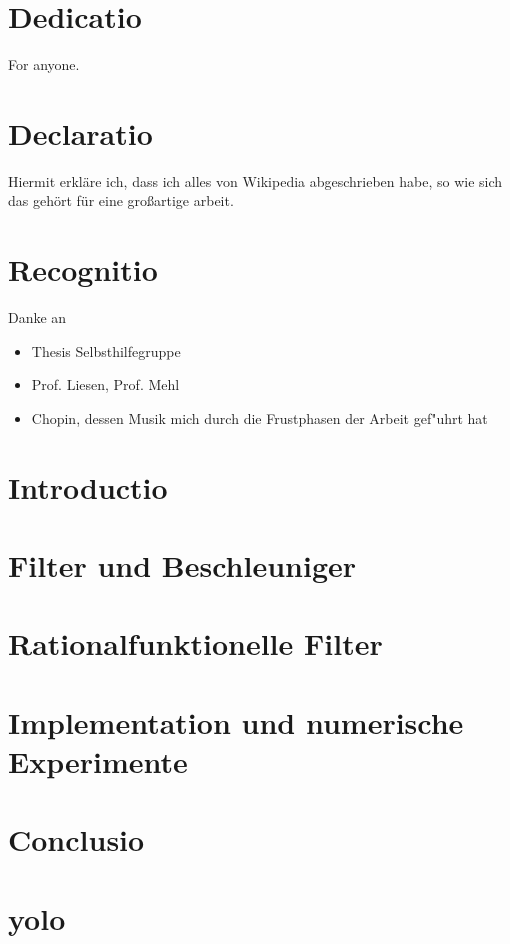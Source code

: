 \documentclass[12pt, twoside]{report} %
\begin{document}


\chapter*{Dedicatio}
For anyone.

\chapter*{Declaratio}
Hiermit erkläre ich, dass ich alles von Wikipedia abgeschrieben habe, so
wie sich das gehört für eine großartige arbeit.

\chapter*{Recognitio}
Danke an
\begin{itemize}
\item Thesis Selbsthilfegruppe
\item Prof. Liesen, Prof. Mehl
\item Chopin, dessen Musik mich durch die Frustphasen der Arbeit gef"uhrt hat
\end{itemize}

\tableofcontents

\chapter{Introductio}


\chapter{Filter und Beschleuniger}


\chapter{Rationalfunktionelle Filter}


\chapter{Implementation und numerische Experimente}


\chapter{Conclusio}


\appendix
\chapter{yolo}


\printbibliography
\end{document}
